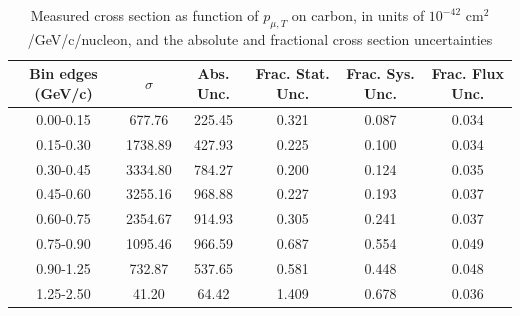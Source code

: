 \documentclass[../main.tex]{subfiles}
\begin{document}
\begin{table}
  \centering
  \renewcommand{\arraystretch}{1.15}
  \caption{Systematic covariance matrix of measured cross section in $p_{\mu,||}$ on carbon, in units of $10^{-84}$ $(\text{cm}^2$/GeV/c/nucleon$)^2$}
  \label{tbl:sysnucleonnuc6muon_pzc}
\end{table}
\pagebreak
\begin{turnpage}
\end{turnpage}
\begin{table}
  \centering
  \renewcommand{\arraystretch}{1.15}
  \caption{Measured cross section as function of $p_{\mu,T}$ on carbon, in units of $10^{-42}$ $\text{cm}^2$/GeV/c/nucleon, and the absolute and fractional cross section uncertainties}
    \begin{tabular}{c||c|c||c|c|c}
      Bin edges (GeV/c) &  $\sigma$  &  Abs. Unc.  &  Frac. Stat. Unc.  &  Frac. Sys. Unc.  &  Frac. Flux Unc. \\
      \hline
      \hline
      0.00-0.15 & 677.76 & 225.45 & 0.321 & 0.087 & 0.034\\
      0.15-0.30 & 1738.89 & 427.93 & 0.225 & 0.100 & 0.034\\
      0.30-0.45 & 3334.80 & 784.27 & 0.200 & 0.124 & 0.035\\
      0.45-0.60 & 3255.16 & 968.88 & 0.227 & 0.193 & 0.037\\
      0.60-0.75 & 2354.67 & 914.93 & 0.305 & 0.241 & 0.037\\
      0.75-0.90 & 1095.46 & 966.59 & 0.687 & 0.554 & 0.049\\
      0.90-1.25 & 732.87 & 537.65 & 0.581 & 0.448 & 0.048\\
      1.25-2.50 & 41.20 & 64.42 & 1.409 & 0.678 & 0.036
    \end{tabular}
  \label{tbl:datanucleonnuc6muon_pta}
\end{table}
\end{document}
